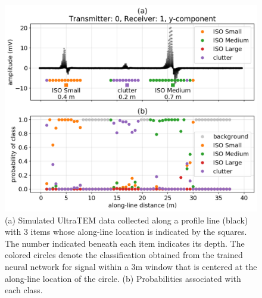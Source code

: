 \begin{figure}[htb]
    \vspace{-0.1cm}
    \begin{center}
    \includegraphics[width=\columnwidth]{figures/profile-line.png}
    \end{center}
    \vspace{-0.5cm}
\caption{
    (a) Simulated UltraTEM data collected along a profile line (black) with 3 items whose along-line location is indicated by the squares.
    The number indicated beneath each item indicates its depth.
    The colored circles denote the classification obtained from the trained neural network for signal within a 3m window that is centered at the along-line location of the circle.
    (b) Probabilities associated with each class.
}
\label{fig:profile-line}
\vspace{-0.1cm}
\end{figure}

